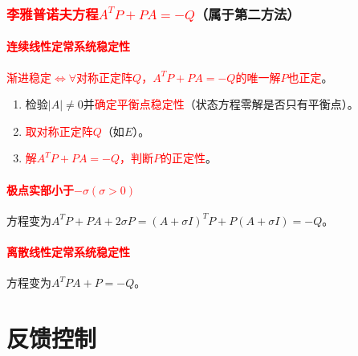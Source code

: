 \documentclass[
12pt, %
a4paper, 
oneside, %
]{scrartcl}
\begin{document}
\subsubsection[李雅普诺夫方程]{\textcolor{red}{李雅普诺夫方程$ A^T P + P A = -Q $}（属于第二方法）}
\paragraph{\textcolor{red}{连续线性定常系统稳定性}}
\textcolor{red}{渐进稳定$ \Leftrightarrow $$ \forall $对称正定阵$ Q $，$ A^T P + P A = -Q $的唯一解$ P $也正定}。
\begin{enumerate}
\item 检验$ |A| \neq 0 $并\textcolor{red}{确定平衡点稳定性}（状态方程零解是否只有平衡点）。
\item \textcolor{red}{取对称正定阵$ Q $}（如$ E $）。
\item \textcolor{red}{解$ A^T P + P A = -Q $，判断$ P $的正定性}。
\end{enumerate}
\paragraph{\textcolor{red}{极点实部小于$ -\sigma(\sigma > 0) $}}
方程变为$ A^T P + P A + 2 \sigma P = (A + \sigma I)^T P + P (A + \sigma I) = -Q $。
\paragraph{\textcolor{red}{离散线性定常系统稳定性}}
方程变为$ A^T P A + P = -Q $。
\section{反馈控制}
\end{document}
